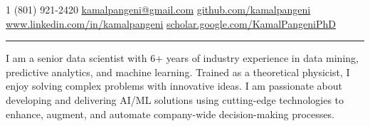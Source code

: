 \documentclass[10pt,letterpaper]{article}
\begin{document}

\noindent\textsmaller{+}1 (801) 921-2420\bull
\href{mailto:kamalpangeni@gmail.com}{kamalpangeni@gmail.com}\bull
\href{https://github.com/kamalpangeni}
{github.com/kamalpangeni}\\
\href{https://www.linkedin.com/in/kamal-pangeni-31242a29/}
{www.linkedin.com/in/kamalpangeni}\bull
\href{https://scholar.google.com/citations?user=MJPS73gAAAAJ&hl=en}
{scholar.google.com/\textsmaller{+}KamalPangeniPhD}


\hrule
\vspace{1ex}
I am a senior data scientist with 6+ years of industry experience in data mining, predictive analytics, and machine learning. Trained as a theoretical physicist, I enjoy solving complex problems with innovative ideas. I am passionate about developing and delivering AI/ML solutions using cutting-edge technologies to enhance, augment, and automate company-wide decision-making processes.
\vspace{-2ex}
 
\end{document}
